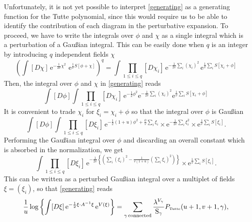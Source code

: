 \documentclass[12pt,here,feynmf]{article}
\begin{document}
Unfortunately, it is not yet possible to interpret \eqref{generating} as a generating function for the Tutte polynomial, since this would require us to be able to identify the contribution of each diagram in the  perturbative expansion. To proceed, we have to write the integrals over $\phi$ and $\chi$ as a single integral which is a perturbation of a Gau\ss ian integral.   This can be easily done when $q$ is an integer by introducing $q$ independent fields $\chi$ 
\begin{equation}
\left(
\int[D\chi]\,\mathrm{e}^{-\frac{1}{2v}\chi^{2}}\,
\,\mathrm{e}^{\frac{1}{v}S[\phi+\chi]}
\right)^{q}
=\int \prod_{1\leq i\leq q}[D\chi_{i}]\,
\mathrm{e}^{-\frac{1}{2v}\sum_{i}(\chi_{i})^{2}}\,\mathrm{e}^{\frac{1}{v}\sum_{i}S[\chi_{i}+\phi]}
\end{equation}
Then, the integral over $\phi$ and $\chi$ in \eqref{generating} reads
\begin{equation}
\int[D\phi]\int \prod_{1\leq i\leq q}[D\chi_{i}]\,
\mathrm{e}^{-\frac{1}{2}\phi^{2}}
\mathrm{e}^{-\frac{1}{2v}\sum_{i}(\chi_{i})^{2}}\mathrm{e}^{\frac{1}{v}\sum_{i}S[\chi_{i}+\phi]}
\end{equation}
It is convenient to trade $\chi_{i}$ for $\xi_{i}=\chi_{i}+\phi$ so that the integral over $\phi$ is Gau\ss ian 
\begin{equation}
\int [D\phi]\int \prod_{1\leq i\leq q}[D\xi_{i}]\,
\mathrm{e}^{-\frac{1}{2}\left(1+u\right)\phi^{2}
+\frac{\phi}{v}\sum_{i}\xi_{i}}
\times\mathrm{e}^{-\frac{1}{2v}\sum_{i}\xi_{i}^{2}}
\times\mathrm{e}^{\frac{1}{v}\sum_{i}S[\xi_{i}]}.
 \end{equation}
Performing the Gau\ss ian integral over $\phi$  and discarding an overall constant which is absorbed in the normalization, we get
\begin{equation}
\int \prod_{1\leq i\leq q}[D\xi_{i}]\,
\mathrm{e}^{-\frac{1}{2v}\left\{
\left(\sum_{i}(\xi_{i})^{2}-\frac{1}{v(1+u)}\left(\sum_{i}\xi_{i}\right)^{2}\right)\right\}}
\times\mathrm{e}^{\frac{1}{v}\sum_{i}S[\xi_{i}]}.
 \end{equation}
This can be written as a perturbed Gau\ss ian integral over a multiplet of fields $\xi=(\xi_{i})$, so that \eqref{generating} reads
\begin{equation}
\frac{1}{u}\log\left\{
\int  [D\xi]\,
\mathrm{e}^{
-\frac{1}{2}\xi\cdot A^{-1}\xi}\, \mathrm{e}^{V(\xi)}
\right\}=
\sum_{\gamma\,\mathrm{connected}}
\frac{\lambda^{V_{\gamma}}}{\mathrm{S}_{\gamma}}P_{\mbox{\tiny Tutte}}(u+1,v+1,\gamma),
\label{generating2}
\end{equation}
\end{document}
